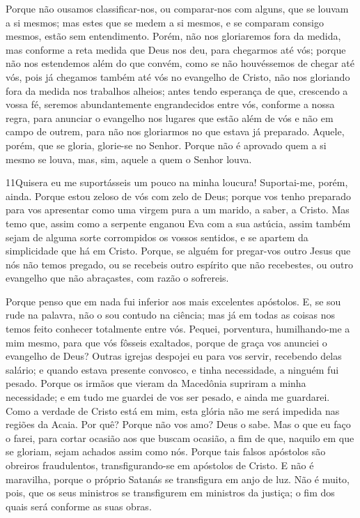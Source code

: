 Porque não ousamos classificar-nos, ou comparar-nos com alguns,
que se louvam a si mesmos; mas estes que se medem a si mesmos, e se
comparam consigo mesmos, estão sem entendimento. Porém, não
nos gloriaremos fora da medida, mas conforme a reta medida que Deus
nos deu, para chegarmos até vós; porque não nos estendemos
além do que convém, como se não houvéssemos de chegar até vós, pois
já chegamos também até vós no evangelho de Cristo, não nos
gloriando fora da medida nos trabalhos alheios; antes tendo
esperança de que, crescendo a vossa fé, seremos abundantemente
engrandecidos entre vós, conforme a nossa regra, para
anunciar o evangelho nos lugares que estão além de vós e não em
campo de outrem, para não nos gloriarmos no que estava já preparado.
Aquele, porém, que se gloria, glorie-se no Senhor.
Porque não é aprovado quem a si mesmo se louva, mas, sim,
aquele a quem o Senhor louva.

\medskip

\lettrine{11} Quisera eu me suportásseis um pouco na minha
loucura! Suportai-me, porém, ainda. Porque estou zeloso de vós
com zelo de Deus; porque vos tenho preparado para vos apresentar
como uma virgem pura a um marido, a saber, a Cristo. Mas temo
que, assim como a serpente enganou Eva com a sua astúcia, assim
também sejam de alguma sorte corrompidos os vossos sentidos, e se
apartem da simplicidade que há em Cristo. Porque, se alguém for
pregar-vos outro Jesus que nós não temos pregado, ou se recebeis
outro espírito que não recebestes, ou outro evangelho que não
abraçastes, com razão o sofrereis.

Porque penso que em nada fui inferior aos mais excelentes
apóstolos. E, se sou rude na palavra, não o sou contudo na
ciência; mas já em todas as coisas nos temos feito conhecer
totalmente entre vós. Pequei, porventura, humilhando-me a mim
mesmo, para que vós fôsseis exaltados, porque de graça vos anunciei
o evangelho de Deus? Outras igrejas despojei eu para vos servir,
recebendo delas salário; e quando estava presente convosco, e tinha
necessidade, a ninguém fui pesado. Porque os irmãos que vieram
da Macedônia supriram a minha necessidade; e em tudo me guardei de
vos ser pesado, e ainda me guardarei. Como a verdade de
Cristo está em mim, esta glória não me será impedida nas regiões da
Acaia. Por quê? Porque não vos amo? Deus o sabe. Mas o
que eu faço o farei, para cortar ocasião aos que buscam ocasião, a
fim de que, naquilo em que se gloriam, sejam achados assim como nós.
Porque tais falsos apóstolos são obreiros fraudulentos,
transfigurando-se em apóstolos de Cristo. E não é maravilha,
porque o próprio Satanás se transfigura em anjo de luz. Não é
muito, pois, que os seus ministros se transfigurem em ministros da
justiça; o fim dos quais será conforme as suas obras.

